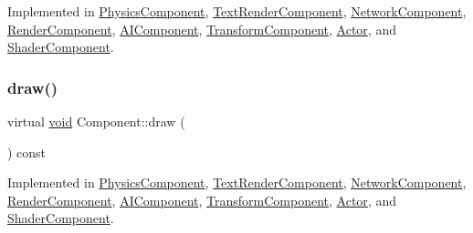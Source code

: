 Implemented in \hyperlink{classPhysicsComponent_afe1f99cac34411e9de43abebfcef0713}{Physics\+Component}, \hyperlink{classTextRenderComponent_adb02fc97e8e67e7d3035b38c2860bfab}{Text\+Render\+Component}, \hyperlink{classNetworkComponent_a43dbac0f78d86a74c3b22006db82b0e8}{Network\+Component}, \hyperlink{classRenderComponent_af2bf016f9a929d97b4c0c31db8e3842f}{Render\+Component}, \hyperlink{classAIComponent_ab4d6c5c6043cfa275e4edce5b575a8a9}{A\+I\+Component}, \hyperlink{classTransformComponent_a5447f13e20359c750f165332015af3ea}{Transform\+Component}, \hyperlink{classActor_adbbdc379c1a471cc9763d871b0790d7e}{Actor}, and \hyperlink{classShaderComponent_a1ac6a772f197d759e9ae11fae0551687}{Shader\+Component}.

\mbox{\label{classComponent_a8f45309003f02191f2bcc8864e8e9ecf}} 
\subsubsection{\texorpdfstring{draw()}{draw()}\hspace{0.1cm}{\footnotesize\ttfamily [2/2]}}
{\footnotesize\ttfamily virtual \hyperlink{imgui__impl__opengl3__loader_8h_ac668e7cffd9e2e9cfee428b9b2f34fa7}{void} Component\+::draw (\begin{DoxyParamCaption}{ }\end{DoxyParamCaption}) const\hspace{0.3cm}{\ttfamily [pure virtual]}}



Implemented in \hyperlink{classPhysicsComponent_afe1f99cac34411e9de43abebfcef0713}{Physics\+Component}, \hyperlink{classTextRenderComponent_adb02fc97e8e67e7d3035b38c2860bfab}{Text\+Render\+Component}, \hyperlink{classNetworkComponent_a43dbac0f78d86a74c3b22006db82b0e8}{Network\+Component}, \hyperlink{classRenderComponent_af2bf016f9a929d97b4c0c31db8e3842f}{Render\+Component}, \hyperlink{classAIComponent_ab4d6c5c6043cfa275e4edce5b575a8a9}{A\+I\+Component}, \hyperlink{classTransformComponent_a5447f13e20359c750f165332015af3ea}{Transform\+Component}, \hyperlink{classActor_adbbdc379c1a471cc9763d871b0790d7e}{Actor}, and \hyperlink{classShaderComponent_a1ac6a772f197d759e9ae11fae0551687}{Shader\+Component}.

\mbox{\label{classComponent_a3a1537a8b8bcdb2155afbb925c77b0a2}} 
